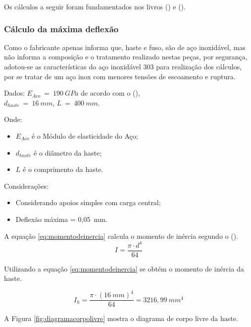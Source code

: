Os cálculos a seguir foram fundamentados nos 
livros \citeauthor{juvinall2020fundamentals} (\citeyear{juvinall2020fundamentals}) 
e \citeauthor{budynas2016elementos} (\citeyear{budynas2016elementos}).

\subsubsection{Cálculo da máxima deflexão}

Como o fabricante apenas informa que, haste e fuso, são de aço inoxidável, mas não informa 
a composição e o tratamento realizado nestas peças, por segurança, adotou-se as 
características do aço inoxidável 303 para realização dos cálculos, por se tratar de um aço 
inox com menores tensões de escoamento e ruptura.

Dados: 
$E_{Aco}~=~190~GPa$ de acordo com o \citeauthor{juvinall2020fundamentals} (\citeyear{juvinall2020fundamentals}),\\
$d_{haste}~=~16~mm$, $L~=~400~mm$.

Onde:
\begin{itemize}
    \item $E_{Aco}$ é o Módulo de elasticidade do Aço;
    \item $d_{haste}$ é o diâmetro da haste;
    \item $L$ é o comprimento da haste.
\end{itemize}

Considerações:
\begin{itemize}
    \item Considerando apoios simples com carga central;
    \item Deflexão máxima = 0,05~mm.
\end{itemize}

A equação \ref{eq:momentodeinercia} calcula o momento de inércia segundo o \citeauthor{juvinall2020fundamentals} (\citeyear{juvinall2020fundamentals}).
\begin{equation}\label{eq:momentodeinercia}
    I = \frac{\pi \cdot d^{4}}{64}
\end{equation}

Utilizando a equação \ref{eq:momentodeinercia} se obtém o momento de inércia da haste.

$$I_{h} = \frac{\pi \cdot (16~mm)^{4}}{64} = 3216,99~mm^{4}$$   

A Figura \ref{fig:diagramacorpolivre} mostra o diagrama de corpo livre da haste.

